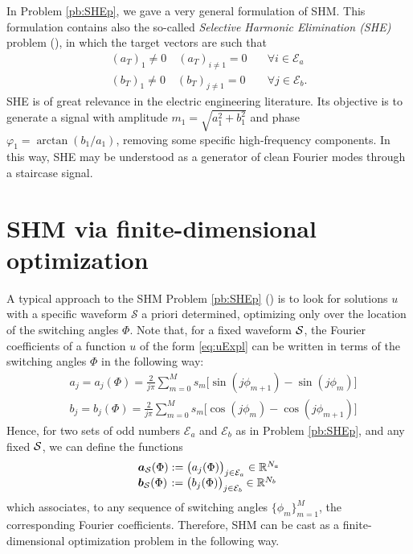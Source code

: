 \documentclass[twocolumn]{autart}    %
\begin{document}
\vspace{0.5em}
\begin{remark}[SHE]\label{remark:SHE}
In Problem \ref{pb:SHEp}, we gave a very general formulation of SHM. This formulation contains also the so-called \emph{Selective Harmonic Elimination (SHE)} problem (\cite{Sun1996}), in which the target vectors are such that 
\begin{displaymath}
	\begin{array}{ll}
		(a_T)_1 \neq 0  \hspace{1em} (a_T)_{i\neq1} = 0 & \quad \forall i \in \mathcal{E}_a 
		\\[3pt]
		(b_T)_1 \neq 0  \hspace{1em} (b_T)_{j\neq1} = 0 & \quad\forall j \in \mathcal{E}_b. 
	\end{array} 
\end{displaymath}
SHE is of great relevance in the electric engineering literature. Its objective is to generate a signal with amplitude $m_1 = \sqrt{a_1^2+b_1^2}$ and phase $\varphi_1=\arctan(b_1/a_1)$, removing some specific high-frequency components. In this way, SHE may be understood as a generator of clean Fourier modes through a staircase signal. 
\end{remark}

\section{SHM via finite-dimensional optimization}\label{sec:SHE_finite-dim_pbm}

A typical approach to the SHM Problem \ref{pb:SHEp} (\cite{Konstantinou2010,perez20172n,Yang2015}) is to look for solutions $u$ with a specific waveform $\mathcal{S}$ a priori determined, optimizing only over the location of the switching angles $\Phi$. Note that, for a fixed waveform $\mathcal{S}$, the Fourier coefficients of a function $u$ of the form \eqref{eq:uExpl} can be written in terms of the switching angles $\Phi$ in the following way:
\begin{align*}
	& a_j = a_j(\Phi) =  \frac{2}{j\pi} \sum_{m=0}^{M} s_m \Big[\sin(j\phi_{m+1}) -\sin(j\phi_{m})\Big]
	\\[5pt]
	& b_j = b_j(\Phi) = \frac{2}{j\pi} \sum_{m=0}^{M} s_m \Big[\cos(j\phi_{m}) -\cos(j\phi_{m+1})\Big]
\end{align*}
Hence, for two sets of odd numbers $\mathcal{E}_a$ and $\mathcal{E}_b$ as in Problem \ref{pb:SHEp}, and any fixed $\mathcal{S}$, we can define the functions
\begin{equation}\label{eq: a_S b_S}
	\begin{array}{l}
		\bm{a}_{\mathcal{S}} (\Phi) := \big(a_j (\Phi)\big)_{j\in \mathcal{E}_a} \in \mathbb{R}^{N_a}
		\\
		\bm{b}_{\mathcal{S}} (\Phi) \hspace{0.1em}:= \big(b_j (\Phi)\big)_{j\in \mathcal{E}_b} \in \mathbb{R}^{N_b}
	\end{array}
\end{equation}
which associates, to any sequence of switching angles $\{\phi_m\}_{m=1}^{M}$, the corresponding Fourier coefficients.
Therefore, SHM can be cast as a finite-dimensional optimization problem in the following way.
\end{document}
